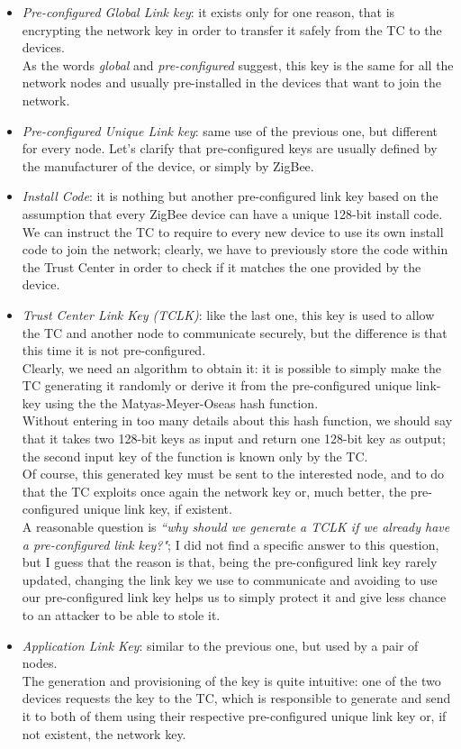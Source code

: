 \documentclass[12pt]{report}
\begin{document}
{\begin{itemize}
\begin{itemize}
\item \emph{Pre-configured Global Link key}: it exists only for one reason, that is encrypting the network key in order to transfer it safely from the TC to the devices.\\
As the words \emph{global} and \emph{pre-configured} suggest, this key is the same for all the network nodes and usually pre-installed in the devices that want to join the network.
\item \emph{Pre-configured Unique Link key}: same use of the previous one, but different for every node.
Let's clarify that pre-configured keys are usually defined by the manufacturer of the device, or simply by ZigBee.
\item \emph{Install Code}: it is nothing but another pre-configured link key based on the assumption that every ZigBee device can have a unique 128-bit install code.\\
We can instruct the TC to require to every new device to use its own install code to join the network; clearly, we have to previously store the code within the Trust Center in order to check if it matches the one provided by the device.
\item \emph{Trust Center Link Key (TCLK)}: like the last one, this key is used to allow the TC and another node to communicate securely, but the difference is that this time it is not pre-configured.\\
Clearly, we need an algorithm to obtain it: it is possible to simply make the TC generating it randomly or derive it from the pre-configured unique link-key using the  the Matyas-Meyer-Oseas hash function.\\ 
Without entering in too many details about this hash function, we should say that it takes two 128-bit keys as input and return one 128-bit key as output; the second input key of the function is known only by the TC.\\
Of course, this generated key must be sent to the interested node, and to do that the TC exploits once again the network key or, much better, the pre-configured unique link key, if existent.\\
A reasonable question is \emph{``why should we generate a TCLK if we already have a pre-configured link key?"}; I did not find a specific answer to this question, but I guess that the reason is that, being the pre-configured link key rarely updated, changing the link key we use to communicate and avoiding to use our pre-configured link key helps us to simply protect it and give less chance to an attacker to be able to stole it.
\item \emph{Application Link Key}: similar to the previous one, but used by a pair of nodes.\\
The generation and provisioning of the key is quite intuitive: one of the two devices requests the key to the TC, which is responsible to generate and send it to both of them using their respective pre-configured unique link key or, if not existent, the network key.
\end{itemize}


\end{itemize}}
\end{document}
